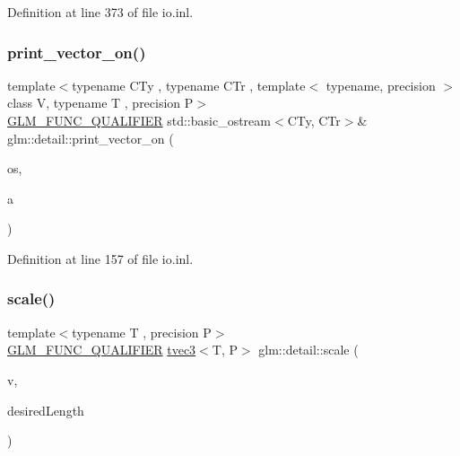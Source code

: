 Definition at line 373 of file io.\+inl.

\mbox{\label{namespaceglm_1_1detail_a96bee64577b69e3a541b02df0f591cc1}} 
\subsubsection{\texorpdfstring{print\_vector\_on()}{print\_vector\_on()}}
{\footnotesize\ttfamily template$<$typename C\+Ty , typename C\+Tr , template$<$ typename, precision $>$ class V, typename T , precision P$>$ \\
\mbox{\hyperlink{setup_8hpp_a33fdea6f91c5f834105f7415e2a64407}{G\+L\+M\+\_\+\+F\+U\+N\+C\+\_\+\+Q\+U\+A\+L\+I\+F\+I\+ER}} std\+::basic\+\_\+ostream$<$C\+Ty, C\+Tr$>$\& glm\+::detail\+::print\+\_\+vector\+\_\+on (\begin{DoxyParamCaption}\item[{std\+::basic\+\_\+ostream$<$ C\+Ty, C\+Tr $>$ \&}]{os,  }\item[{V$<$ T, P $>$ const \&}]{a }\end{DoxyParamCaption})}



Definition at line 157 of file io.\+inl.

\mbox{\label{namespaceglm_1_1detail_af47639907c02055dc95ef962e0ca9a02}} 
\subsubsection{\texorpdfstring{scale()}{scale()}}
{\footnotesize\ttfamily template$<$typename T , precision P$>$ \\
\mbox{\hyperlink{setup_8hpp_a33fdea6f91c5f834105f7415e2a64407}{G\+L\+M\+\_\+\+F\+U\+N\+C\+\_\+\+Q\+U\+A\+L\+I\+F\+I\+ER}} \mbox{\hyperlink{structglm_1_1tvec3}{tvec3}}$<$T, P$>$ glm\+::detail\+::scale (\begin{DoxyParamCaption}\item[{\mbox{\hyperlink{structglm_1_1tvec3}{tvec3}}$<$ T, P $>$ const \&}]{v,  }\item[{T}]{desired\+Length }\end{DoxyParamCaption})}



